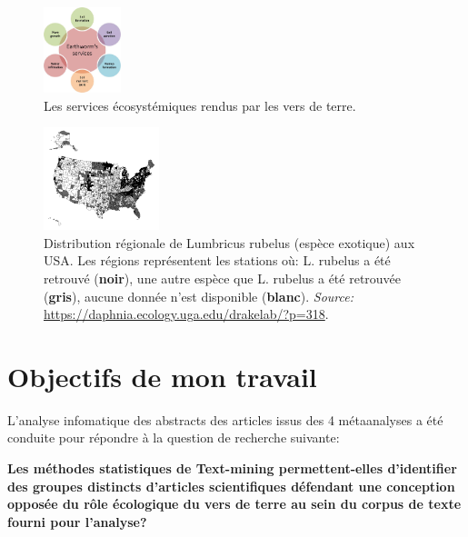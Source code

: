 \documentclass{book}
\begin{document}
\begin{figure}[htb] %
    \begin{center} %
        \includegraphics[width=0.2\textwidth]{EW_services.png}
        \caption{Les services écosystémiques rendus par les vers de terre.}\label{fig_wormsservices}
    \end{center}
\end{figure}

\begin{figure}[htb] %
    \begin{center} %
        \includegraphics[width=0.3\textwidth]{worm-map.png}
        \caption[Distribution régionale de Lumbricus rubelus (espèce exotique) aux USA.]{Distribution régionale de Lumbricus rubelus (espèce exotique) aux USA. Les régions représentent les stations où: L. rubelus a été retrouvé (\textbf{noir}), une autre espèce que L. rubelus a été retrouvée (\textbf{gris}), aucune donnée n'est disponible (\textbf{blanc}).  \textit{Source:} \url{https://daphnia.ecology.uga.edu/drakelab/?p=318}.}\label{fig_wormmap}
    \end{center} 
\end{figure}

\section{Objectifs de mon travail}

\noindent
L'analyse infomatique des abstracts des articles issus des 4 métaanalyses a été conduite pour répondre à la question de recherche suivante:


\vspace{\baselineskip}
\noindent
\textbf{Les méthodes statistiques de Text-mining permettent-elles d'identifier des groupes distincts d'articles scientifiques défendant une conception opposée du rôle écologique du vers de terre au sein du corpus de texte fourni pour l'analyse?}
\end{document}
